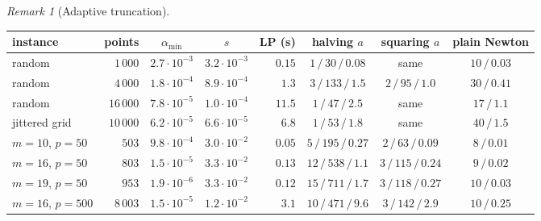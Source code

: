 \documentclass[11pt]{amsart}
\theoremstyle{definition}
\theoremstyle{remark}
\newtheorem{remark}[theorem]{Remark}
\begin{document}
\begin{remark}[Adaptive truncation]
\medskip
\begin{center}
\small
\begin{tabular}{@{}lrccrccc@{}}
\toprule
instance & points & $\alpha_{\min}$ & $s$ & LP (s) & halving $a$ & squaring $a$ & plain Newton\\
\midrule
random & $1\,000$ & $2.7\cdot10^{-3}$ & $3.2\cdot10^{-3}$ & $0.15$ & $1\,/\,30\,/\,0.08$ & same & $10\,/\,0.03$\\
random & $4\,000$ & $1.8\cdot10^{-4}$ & $8.9\cdot10^{-4}$ & $1.3$ & $3\,/\,133\,/\,1.5$ & $2\,/\,95\,/\,1.0$ & $30\,/\,0.41$\\
random & $16\,000$ & $7.8\cdot10^{-5}$ & $1.0\cdot10^{-4}$ & $11.5$ & $1\,/\,47\,/\,2.5$ & same & $17\,/\,1.1$\\
jittered grid & $10\,000$ & $6.2\cdot10^{-5}$ & $6.6\cdot10^{-5}$ & $6.8$ & $1\,/\,53\,/\,1.8$ & same & $40\,/\,1.5$\\
$m=10$, $p=50$ & $503$ & $9.8\cdot10^{-4}$ & $3.0\cdot10^{-2}$ & $0.05$ & $5\,/\,195\,/\,0.27$ & $2\,/\,63\,/\,0.09$ & $8\,/\,0.01$\\
$m=16$, $p=50$ & $803$ & $1.5\cdot10^{-5}$ & $3.3\cdot10^{-2}$ & $0.13$ & $12\,/\,538\,/\,1.1$ & $3\,/\,115\,/\,0.24$ & $9\,/\,0.02$\\
$m=19$, $p=50$ & $953$ & $1.9\cdot10^{-6}$ & $3.3\cdot10^{-2}$ & $0.12$ & $15\,/\,711\,/\,1.7$ & $3\,/\,118\,/\,0.27$ & $10\,/\,0.03$\\
$m=16$, $p=500$ & $8\,003$ & $1.5\cdot10^{-5}$ & $1.2\cdot10^{-2}$ & $3.1$ & $10\,/\,471\,/\,9.6$ & $3\,/\,142\,/\,2.9$ & $10\,/\,0.25$\\
\bottomrule
\end{tabular}
\end{center}
\medskip


\end{remark}
\end{document}
